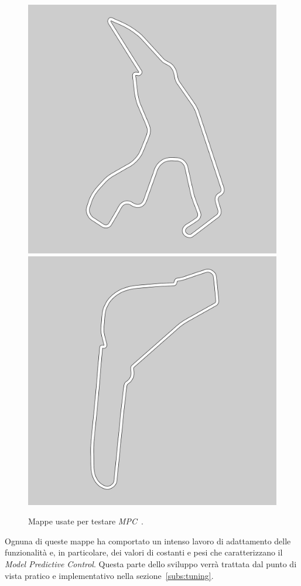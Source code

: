 \begin{figure}[H]
    \includegraphics[width=.47\textwidth, angle=90]{images/Spa_map.png}\hspace{0.2cm}
    \includegraphics[width=.47\textwidth, angle=90]{images/Monza_map.png}
    \caption{Mappe usate per testare \textit{MPC}~\cite{f1tenthtracks}.}
    \label{fig:fig11} %
\end{figure}
Ognuna di queste mappe ha comportato un intenso lavoro di adattamento delle 
funzionalità e, in particolare, dei valori di costanti e pesi che 
caratterizzano il \textit{Model Predictive Control}. Questa parte dello 
sviluppo verrà trattata dal punto di vista pratico e implementativo nella 
sezione~\ref{subs:tuning}.

